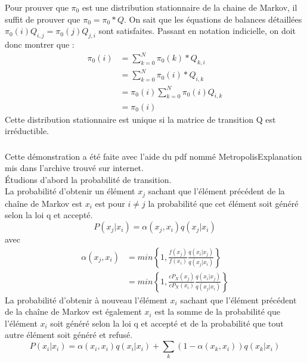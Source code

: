 \documentclass[11pt]{report}
\begin{document}
\subsubsection{}
Pour prouver que $\pi_0$ est une distribution stationnaire de la chaine de Markov, il suffit de prouver que $\pi_0=\pi_0 *Q$. 
On sait que les équations de balances détaillées $\pi_0(i)Q_{i,j} = \pi_0(j)Q_{j,i}$ sont satisfaites.
Passant en notation indicielle, on doit donc montrer que :
\begin{align*}
\pi_0(i) &= \sum^{N}_{k=0} \pi_0(k)*Q_{k,i} \\
& = \sum^{N}_{k=0} \pi_0(i)*Q_{i,k} \\
& = \pi_0(i) \sum^{N}_{k=0} \pi_0(i) Q_{i,k} \\
& = \pi_0(i)
\end{align*}
Cette distribution stationnaire est unique si la matrice de transition Q est irréductible.
\subsubsection{}
Cette démonstration a été faite avec l'aide du pdf nommé MetropolisExplanation mis dans l'archive trouvé sur internet.\\
Étudions d'abord la probabilité de transition.\\
La probabilité d'obtenir un élément $x_j$ sachant que l'élément précédent de la chaîne de Markov est $x_i$ est pour $i \neq j$ la probabilité que cet élément soit généré selon la loi q et accepté.
$$P(x_j | x_i) = \alpha(x_j, x_i) q(x_j| x_i)$$
avec
\begin{align*}
\alpha(x_j, x_i) 
&= min \left\{1, \frac{f(x_j)}{f(x_i)} \frac{q(x_i|x_j)}{q(x_j|x_i)}\right\}\\
&= min \left\{1, \frac{cP_X(x_j)}{cP_X(x_i)} \frac{q(x_i|x_j)}{q(x_j|x_i)}\right\}
\end{align*}
La probabilité d'obtenir à nouveau l'élément $x_i$ sachant que l'élément précédent de la chaîne de Markov est également $x_i$ est la somme de la probabilité que l'élément $x_i$ soit généré selon la loi q et accepté et de la probabilité que tout autre élément soit généré et refusé.
$$P(x_i | x_i) = \alpha(x_i, x_i) q(x_i|x_i) + \sum_k (1-\alpha(x_k, x_i)) q(x_k |x_i)$$
\end{document}

